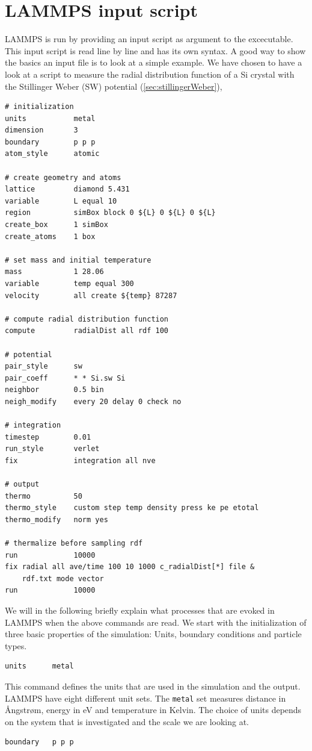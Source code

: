 \documentclass[twoside,english]{uiofysmaster}
\begin{document}
\section{LAMMPS input script} \label{sec:lammpsInputScript}
LAMMPS is run by providing an input script as 
argument to the excecutable. This input script
is read line by line and has its own syntax. 
A good way to show the basics an input file
is to look at a simple example. 
We have chosen to have a look at a script
to measure the radial distribution function of a Si crystal with the Stillinger Weber (SW) potential (\autoref{sec:stillingerWeber}),
\begin{lstlisting}[style=lammps]
# initialization
units 			metal		
dimension 		3
boundary		p p p		
atom_style		atomic		

# create geometry and atoms
lattice 		diamond 5.431
variable		L equal 10
region 			simBox block 0 ${L} 0 ${L} 0 ${L}
create_box		1 simBox
create_atoms	1 box

# set mass and initial temperature
mass			1 28.06
variable		temp equal 300
velocity		all create ${temp} 87287

# compute radial distribution function
compute 		radialDist all rdf 100

# potential 
pair_style		sw
pair_coeff		* * Si.sw Si
neighbor		0.5 bin
neigh_modify	every 20 delay 0 check no

# integration
timestep 		0.01
run_style 		verlet
fix 			integration all nve

# output
thermo			50
thermo_style 	custom step temp density press ke pe etotal 
thermo_modify 	norm yes

# thermalize before sampling rdf
run				10000
fix radial all ave/time 100 10 1000 c_radialDist[*] file &
    rdf.txt mode vector
run				10000
\end{lstlisting}
We will in the following briefly explain what
processes that are evoked in LAMMPS when the 
above commands are read. We start with the initialization of 
three basic properties of the simulation: Units, boundary conditions and particle types.
\begin{lstlisting}[style=lammps]
 units 		metal
\end{lstlisting}
This command defines the units that are used 
in the simulation and the output. LAMMPS have eight
different unit sets. The \texttt{metal} set measures
distance in \AA{}ngstr\o{}m, energy in eV and temperature
in Kelvin. The choice of units depends on the system
that is investigated and the scale we are looking at.
\begin{lstlisting}[style=lammps]
 boundary 	p p p
\end{lstlisting}
\end{document}
